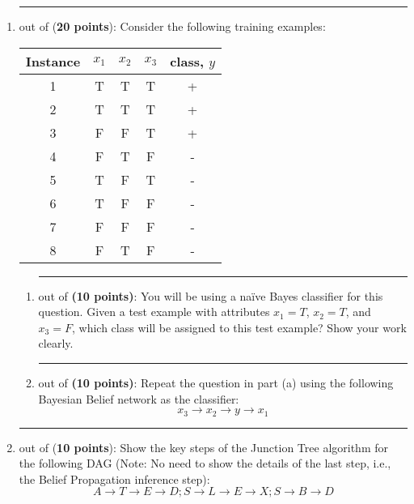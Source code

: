 \documentclass{article}%
\begin{document}
\begin{enumerate}
  \item \rule{0.5 in}{1 pt} out of (\textbf{20 points}): Consider the following training examples:

   \begin{center}
   \small
   \begin{tabular}{|c|ccc|c|} \hline
   Instance & $x_1$ & $x_2$ & $x_3$ & class, $y$ \\ \hline
   1 & T & T & T & + \\
   2 & T & T & T & + \\
   3 & F & F & T & + \\
   4 & F & T & F & - \\
   5 & T & F & T & - \\
   6 & T & F & F & - \\
   7 & F & F & F & - \\
   8 & F & T & F & - \\ \hline
   \end{tabular}
   \normalsize
   \end{center}

    \begin{enumerate}
    \item \rule{0.5 in}{1 pt} out of \textbf{(10 points)}: 
				You will be using a na\"ive Bayes classifier for this question.
        Given a test example with attributes $x_1 = T$, $x_2 =
        T$, and $x_3 = F$, which class will be assigned to this test
        example? Show your work clearly.
        
    \item \rule{0.5 in}{1 pt} out of \textbf{(10 points)}: 
        Repeat the question in part (a) using the following Bayesian Belief
        network as the classifier:
\[{x_3} \to {x_2} \to y \to {x_1}\]
    \end{enumerate}

 \item \rule{0.5 in}{1 pt} out of (\textbf{10 points}): Show the key steps of the Junction Tree algorithm for the following DAG (Note: No need to show the details of the last step, i.e., the Belief Propagation inference step): 
\[A \to T \to E\to D; S \to L \to E\to X; S \to B \to D\]


\end{enumerate}
\end{document}
